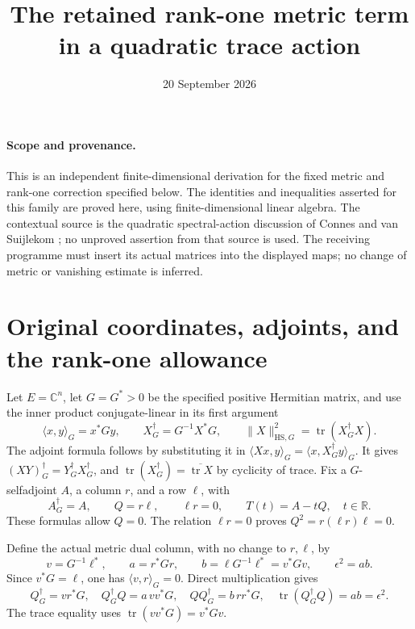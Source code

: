 \documentclass[11pt]{article}
\title{The retained rank-one metric term in a quadratic trace action}
\author{}
\date{20 September 2026}
\newcommand{\tr}{\operatorname{tr}}
\newcommand{\adj}{\dagger_G}
\begin{document}
\maketitle

\paragraph{Scope and provenance.}
This is an independent finite-dimensional derivation for the fixed metric and
rank-one correction specified below. The identities and inequalities asserted
for this family are proved here, using finite-dimensional linear algebra.
The contextual source is the quadratic spectral-action
discussion of Connes and van Suijlekom \cite{CvS}; no unproved assertion from that
source is used. The receiving programme must insert its actual matrices into
the displayed maps; no change of metric or vanishing estimate is inferred.

\section{Original coordinates, adjoints, and the rank-one allowance}

Let \(E=\mathbb C^n\), let \(G=G^*>0\) be the specified positive Hermitian
matrix, and use the inner product conjugate-linear in its first argument
\begin{equation}
 \langle x,y\rangle_G=x^*Gy,\qquad
 X^\adj=G^{-1}X^*G,\qquad
 \|X\|_{\mathrm{HS},G}^2=\tr(X^\adj X).
 \tag{MC1}\label{MC1}
\end{equation}
The adjoint formula follows by substituting it in
\(\langle Xx,y\rangle_G=\langle x,X^\adj y\rangle_G\).
It gives \((XY)^\adj=Y^\adj X^\adj\), and
\(\tr(X^\adj)=\overline{\tr X}\) by cyclicity of trace.
Fix a \(G\)-selfadjoint \(A\), a column \(r\), and a row \(\ell\), with
\begin{equation}
 A^\adj=A,\qquad Q=r\ell,\qquad \ell r=0,\qquad
 T(t)=A-tQ,\quad t\in\mathbb R.
 \tag{MC2}\label{MC2}
\end{equation}
These formulas allow \(Q=0\). The relation \(\ell r=0\) proves
\(Q^2=r(\ell r)\ell=0\).

Define the actual metric dual column, with no change to \(r,\ell\), by
\begin{equation}
 v=G^{-1}\ell^*,\qquad
 a=r^*Gr,\qquad b=\ell G^{-1}\ell^*=v^*Gv,\qquad
 \epsilon^2=ab.
 \tag{MC3}\label{MC3}
\end{equation}
Since \(v^*G=\ell\), one has \(\langle v,r\rangle_G=0\).
Direct multiplication gives
\begin{equation}
 Q^\adj=vr^*G,\quad
 Q^\adj Q=a\,vv^*G,\quad QQ^\adj=b\,rr^*G,\quad
 \tr(Q^\adj Q)=ab=\epsilon^2.
 \tag{MC4}\label{MC4}
\end{equation}
The trace equality uses \(\tr(vv^*G)=v^*Gv\).
\end{document}
